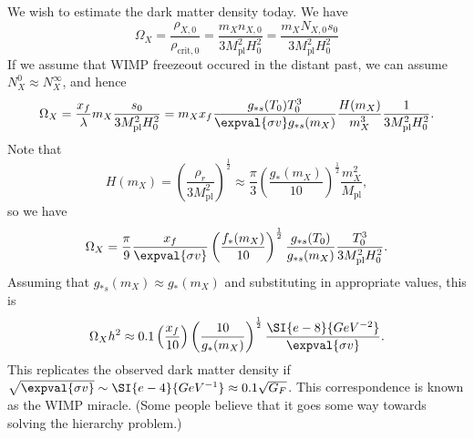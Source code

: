 \documentclass{jknotes}
\begin{document}
We wish to estimate the dark matter density today. We have
\begin{equation}
    \Omega_X = \frac{\rho_{X,0}}{\rho_{\text{crit},0}} 
             = \frac{m_Xn_{X,0}}{3M_{\text{pl}}^2H_0^2} 
             = \frac{m_XN_{X,0}s_0}{3M_{\text{pl}}^2H_0^2}
\end{equation}
If we assume that WIMP freezeout occured in the distant past, we can assume \(N^0_X \approx N^\infty_X\), and hence
\begin{equation}
    \Omega_X = \frac{x_f}{\lambda}m_X\frac{s_0}{3M_{\text{pl}}^2H_0^2} = m_Xx_f \frac{g_{*s}(T_0)T_0^3}{\expval{\sigma v}g_{*s}(m_X)} \frac{H(m_X)}{m_X^3}\frac1{3M_{\text{pl}}^2H_0^2}.
\end{equation}
Note that
\begin{equation}
    H(m_X) = \left(\frac{\rho_r}{3M_{\text{pl}}^2}\right)^{\frac12} \approx \frac\pi3 \left(\frac{g_*(m_X)}{10}\right)^{\frac12} \frac{m_X^2}{M_{\text{pl}}},
\end{equation}
so we have
\begin{equation}
    \Omega_X = \frac\pi9\frac{x_f}{\expval{\sigma v}} \left(\frac{f_*(m_X)}{10}\right)^{\frac12} \frac{g_{*s}(T_0)}{g_{*s}(m_X)} \frac{T_0^3}{3M_{\text{pl}}^2H_0^2}.
\end{equation}
Assuming that \(g_{*s}(m_X) \approx g_*(m_X)\) and substituting in appropriate values, this is
\begin{equation}
    \Omega_Xh^2 \approx 0.1 \left(\frac{x_f}{10}\right)\left(\frac{10}{g_*(m_X)}\right)^{\frac12}\frac{\SI{e-8}{GeV^{-2}}}{\expval{\sigma v}}.
\end{equation}
This replicates the observed dark matter density if \(\sqrt{\expval{\sigma v}} \sim \SI{e-4}{GeV^{-1}}\approx 0.1 \sqrt{G_F}\). This correspondence is known as the WIMP miracle. (Some people believe that it goes some way towards solving the hierarchy problem.)
\end{document}
